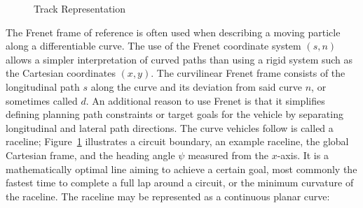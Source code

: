\begin{figure}[htbp]
    \centering
    \caption{Track Representation}
    \label{fig:trackrep}
\end{figure}

The Frenet frame of reference is often used when describing a moving particle along a differentiable curve.
The use of the Frenet coordinate system $(s, n)$ allows a simpler interpretation of curved paths than using a rigid system such as the Cartesian coordinates $(x, y)$.
The curvilinear Frenet frame consists of the longitudinal path $s$ along the curve and its deviation from said curve $n$, or sometimes called $d$.
An additional reason to use Frenet is that it simplifies defining planning path constraints or target goals for the vehicle by separating longitudinal and lateral path directions. 
The curve vehicles follow is called a raceline; Figure~\ref{fig:trackrep} illustrates a circuit boundary, an example raceline, the global Cartesian frame, and the heading angle $\psi$ measured from the $x$-axis.
It is a mathematically optimal line aiming to achieve a certain goal, most commonly the fastest time to complete a full lap
around a circuit, or the minimum curvature of the raceline. The raceline may be represented as a continuous planar curve:

